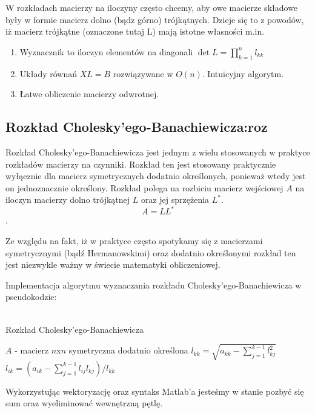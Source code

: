 \documentclass[12pt]{article}
\begin{document}
W rozkładach macierzy na iloczyny często chcemy, aby owe macierze składowe były w formie macierz dolno (bądz górno) trójkątnych. 
Dzieje się to z powodów, iż macierz trójkątne (oznaczone tutaj L) mają istotne własności m.in.
\begin{enumerate}
    \item Wyznacznik to iloczyn elementów na diagonali $\det{L} = \prod_{k=1}^n{l_{kk}}$
    \item Układy równań $XL=B$ rozwiązywane w $O(n)$. Intuicyjny algorytm.
    \item Łatwe obliczenie macierzy odwrotnej.
\end{enumerate}

\subsection{Rozkład Cholesky'ego-Banachiewicza:roz}

Rozkład Cholesky’ego-Banachiewicza jest jednym z wielu stosowanych w praktyce rozkładów macierzy na czynniki. Rozkład ten jest stosowany praktycznie wyłącznie dla macierz symetrycznych dodatnio określonych, ponieważ wtedy jest on jednoznacznie określony.
Rozkład polega na rozbiciu macierz wejściowej $A$ na iloczyn macierzy dolno trójkątnej $L$ oraz jej sprzężenia $L^*$.
$$A = L L^*$$.

Ze względu na fakt, iż w praktyce często spotykamy się z macierzami symetrycznymi (bądź Hermanowskimi) oraz dodatnio określonymi rozkład ten jest niezwykle ważny w świecie matematyki obliczeniowej. 

Implementacja algorytmu wyznaczania rozkładu Cholesky’ego-Banachiewicza w pseudokodzie:
\\
\\
    
\begin{algorithm}
\caption{Rozkład Cholesky’ego-Banachiewicza}\label{alg:cap}
\begin{algorithmic}
\Require $A$ - macierz $n$x$n$ symetryczna dodatnio określona  
    \State $l_{k k}=\sqrt{a_{k k}-\sum_{j=1}^{k-1} l_{k j}^2}$  
     
        \State $l_{i k}=\left(a_{i k}-\sum_{j=1}^{k-1} l_{i j} l_{k j}\right) / l_{k k}$
    \EndFor
\EndFor
\end{algorithmic}
\end{algorithm}

Wykorzystując wektoryzację oraz syntaks Matlab'a jesteśmy w stanie pozbyć się sum oraz wyeliminować wewnętrzną pętlę.
\end{document}
